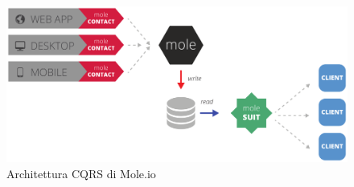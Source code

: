 





\begin{figure}[h]
\centering
\includegraphics[width=1.0\linewidth]{./img/cqrs}
\caption[Architettura CQRS di Mole.io]{Architettura CQRS di Mole.io}
\label{fig:cqrs}
\end{figure}